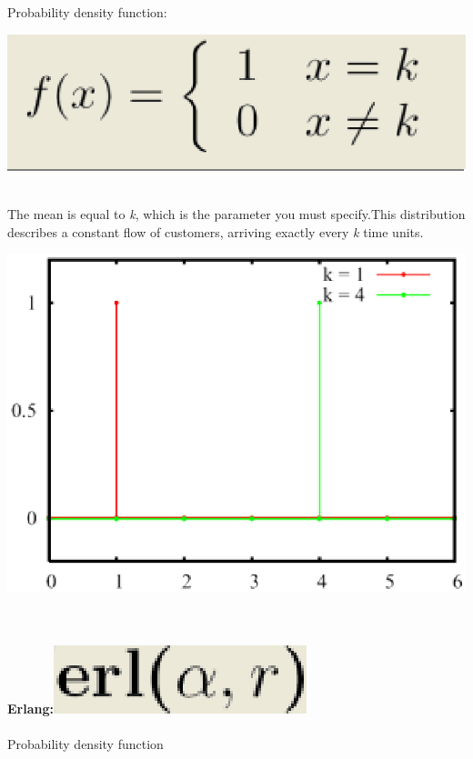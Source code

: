 \\\\
\noindent Probability density function:
\begin{center}
\includegraphics[scale=.5]{img/jsim/constant1.eps}
\end{center}
\\
The mean is equal to \emph{k}, which is the parameter  you must specify.This distribution describes a constant flow of customers, arriving exactly every \emph{k} time units.\\
\begin{center}
\includegraphics[scale=.5]{img/jsim/const_pdf.eps}
\end{center}
\\
\\ %
\textbf{Erlang:}\includegraphics[scale=.5]{img/jsim/erlang_f.eps}
\\\\
Probability density function
\\\\
